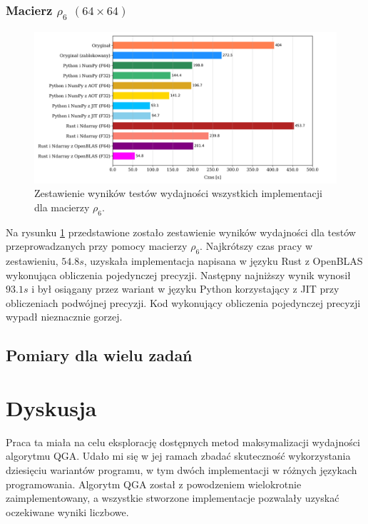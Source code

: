 \documentclass[11pt, a4paper]{article}
\begin{document}
\begin{sloppypar}
    \subsubsection{Macierz \texorpdfstring{$\rho_{6}$ $(64\times64)$}{rho6 64x64}}
    \begin{figure}[ht]
      \centering
      \includegraphics[width=1.0\textwidth]{"resources/rho_6_matrix_comparison.png"}
      \caption{Zestawienie wyników testów wydajności wszystkich implementacji dla macierzy $\rho
      _{6}$.}
      \label{matrix-comparison-rho-6-plot}
    \end{figure}
    Na rysunku \ref{matrix-comparison-rho-6-plot} przedstawione zostało zestawienie
    wyników wydajności dla testów przeprowadzanych przy pomocy macierzy $\rho_{6}$. Najkrótszy
    czas pracy w zestawieniu, $54.8s$, uzyskała implementacja napisana w języku Rust z OpenBLAS
    wykonująca obliczenia pojedynczej precyzji. Następny najniższy wynik wynosił $93.1s$
    i był osiągany przez wariant w języku Python korzystający z JIT przy obliczeniach
    podwójnej precyzji. Kod wykonujący obliczenia pojedynczej precyzji wypadł nieznacznie
    gorzej.

    \FloatBarrier

    \subsection{Pomiary dla wielu zadań}


    \section{Dyskusja}


    Praca ta miała na celu eksplorację dostępnych metod maksymalizacji wydajności
    algorytmu QGA. Udało mi się w jej ramach zbadać skuteczność wykorzystania dziesięciu
    wariantów programu, w tym dwóch implementacji w różnych językach programowania. Algorytm
    QGA został z powodzeniem wielokrotnie zaimplementowany, a wszystkie stworzone
    implementacje pozwalały uzyskać oczekiwane wyniki liczbowe.


\end{sloppypar}
\end{document}
